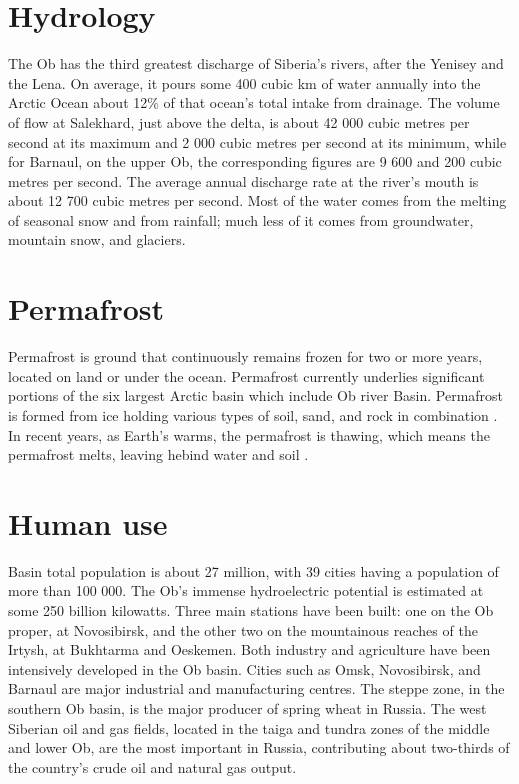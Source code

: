 \section{Hydrology}
The Ob has the third greatest discharge of Siberia's rivers, after the Yenisey and the Lena. On average, it pours some 400 cubic km of water annually into the Arctic Ocean about 12\% of that ocean's total intake from drainage.
The volume of flow at Salekhard, just above the delta, is about 42 000 cubic metres per second at its maximum and 2 000 cubic metres per second at its minimum, while for Barnaul, on the upper Ob, the corresponding figures are 9 600 and 200 cubic metres per second. The average annual discharge rate at the river's mouth is about 12 700 cubic metres per second. Most of the water comes from the melting of seasonal snow and from rainfall; much less of it comes from groundwater, mountain snow, and glaciers.\cite{Obriver}
\section{Permafrost}
Permafrost is ground that continuously remains frozen for two or more years, located on land or under the ocean. Permafrost currently underlies significant portions of the six largest Arctic basin \cite{frey2009impacts} which include Ob river Basin. Permafrost is formed from ice holding various types of soil, sand, and rock in combination \cite{permafrost}. In recent years, as Earth's warms, the permafrost is thawing, which means the permafrost melts, leaving hebind water and soil \cite{permafrost}.
\section{Human use}
Basin total population is about 27 million, with 39 cities having a population of more than 100 000. The Ob's immense hydroelectric potential is estimated at some 250 billion kilowatts. Three main stations have been built: one on the Ob proper, at Novosibirsk, and the other two on the mountainous reaches of the Irtysh, at Bukhtarma and Oeskemen. Both industry and agriculture have been intensively developed in the Ob basin. Cities such as Omsk, Novosibirsk, and Barnaul are major industrial and manufacturing centres. The steppe zone, in the southern Ob basin, is the major producer of spring wheat in Russia. The west Siberian oil and gas fields, located in the taiga and tundra zones of the middle and lower Ob, are the most important in Russia, contributing about two-thirds of the country's crude oil and natural gas output.